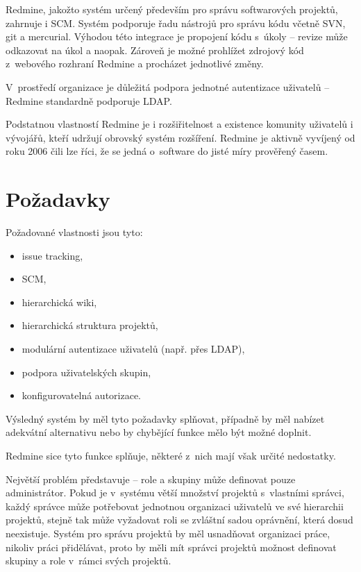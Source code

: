 \documentclass[thesis=B,czech]{FITthesis}[2012/05/02]
\begin{document}
Redmine, jakožto systém určený především pro správu softwarových
projektů, zahrnuje i \gls{SCM}. Systém podporuje řadu nástrojů pro
správu kódu včetně \gls{SVN}, \gls{git} a \gls{mercurial}. Výhodou této
integrace je propojení kódu s~úkoly -- revize může odkazovat na úkol a
naopak. Zároveň je možné prohlížet zdrojový kód z~webového rozhraní
Redmine a procházet jednotlivé změny.

V~prostředí organizace je důležitá podpora jednotné autentizace
uživatelů -- Redmine standardně podporuje \gls{LDAP}.

Podstatnou vlastností Redmine je i rozšiřitelnost a existence komunity
uživatelů i vývojářů, kteří udržují obrovský systém rozšíření. Redmine
je aktivně vyvíjený od roku 2006 čili lze říci, že se jedná o~software
do jisté míry prověřený časem.

\section{Požadavky}

Požadované vlastnosti jsou tyto:

\begin{itemize}
\item
  issue tracking,
\item
  \gls{SCM},
\item
  hierarchická wiki,
\item
  hierarchická struktura projektů,
\item
  modulární autentizace uživatelů (např. přes \gls{LDAP}),
\item
  podpora uživatelských skupin,
\item
  konfigurovatelná autorizace.
\end{itemize}
Výsledný systém by měl tyto požadavky splňovat, případně by měl nabízet
adekvátní alternativu nebo by chybějící funkce mělo být možné doplnit.

Redmine sice tyto funkce splňuje, některé z~nich mají však určité
nedostatky.

Největší problém představuje  -- role a skupiny může definovat
pouze administrátor. Pokud je v~systému větší množství projektů
s~vlastními správci, každý správce může potřebovat jednotnou organizaci
uživatelů ve své hierarchii projektů, stejně tak může vyžadovat roli se
zvláštní sadou oprávnění, která dosud neexistuje. Systém pro správu
projektů by měl usnadňovat organizaci práce, nikoliv práci přidělávat,
proto by měli mít správci projektů možnost definovat skupiny a role
v~rámci svých projektů.
\end{document}
